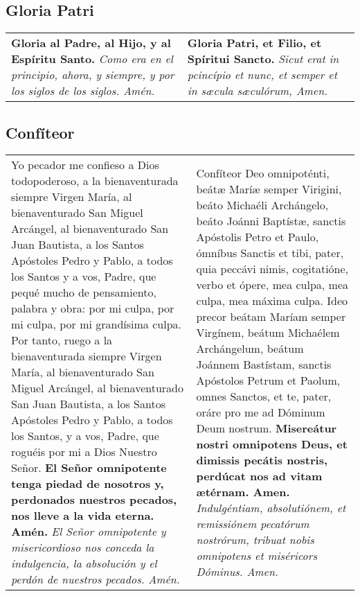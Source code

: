 \documentclass[./devocionario.tex]{subfiles}
\begin{document}
\subsection*{Gloria Patri}
\begin{tabular} { p{} p{} }
    \textbf{Gloria al Padre, al Hijo, y al Espíritu Santo.}\newline
    \textit{Como era en el principio, ahora, y siempre, y por los siglos de los siglos. Amén.}\newline
    
    &
    
    \textbf{Gloria Patri, et Filio, et Spíritui Sancto.}\newline
    \textit{Sicut erat in pcincípio et nunc, et semper et in sæcula sæculórum, Amen.}
\end{tabular}

\subsection*{Confíteor}
\begin{tabular} { p{} p{} }
    Yo pecador me confieso a Dios todopoderoso, a la bienaventurada siempre Virgen María, al bienaventurado San Miguel Arcángel, 
    al bienaventurado San Juan Bautista, a los Santos Apóstoles Pedro y Pablo, a todos los Santos y a vos, Padre, que pequé mucho 
    de pensamiento, palabra y obra: por mi culpa, por mi culpa, por mi grandísima culpa. Por tanto, ruego a la bienaventurada 
    siempre Virgen María, al bienaventurado San Miguel Arcángel, al bienaventurado San Juan Bautista, a los Santos Apóstoles 
    Pedro y Pablo, a todos los Santos, y a vos, Padre, que roguéis por mi a Dios Nuestro Señor.\newline
    \textbf{El Señor omnipotente tenga piedad de nosotros y, perdonados nuestros pecados, nos lleve a la vida eterna. Amén.}\newline
    \textit{El Señor omnipotente y misericordioso nos conceda la indulgencia, la absolución y el perdón de nuestros pecados. Amén.}

    &

    Confíteor Deo omnipoténti, beátæ Maríæ semper Virigini, beáto Michaéli Archángelo, beáto Joánni Baptístæ, sanctis Apóstolis Petro et Paulo, 
    ómníbus Sanctis et tibi, pater, quia peccávi nimis, cogitatióne, verbo et ópere, mea culpa, mea culpa, mea máxima culpa. Ideo precor beátam 
    Maríam semper Virgínem, beátum Michaélem Archángelum, beátum Joánnem Bastístam, sanctis Apóstolos Petrum et Paolum, omnes Sanctos, et te, pater, 
    oráre pro me ad Dóminum Deum nostrum.\newline
    \textbf{Misereátur nostri omnipotens Deus, et dimissis pecátis nostris, perdúcat nos ad vitam ætérnam. Amen.}\newline
    \textit{Indulgéntiam, absolutiónem, et remissiónem pecatórum nostrórum, tribuat nobis omnipotens et miséricors Dóminus. Amen.}
\end{tabular}
\end{document}

